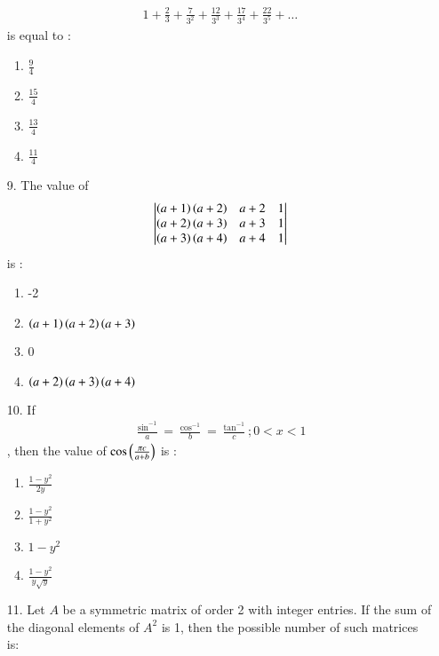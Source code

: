 \documentclass[journal,12pt,onecolumn]{IEEEtran}
\theoremstyle{remark}
\begin{document}
\begin{enumerate}
\begin{align}
		1 + \frac{2}{3} + \frac{7}{3^2} + \frac{12}{3^3} + \frac{17}{3^4} + \frac{22}{3^5} + \dots
	\end{align} is equal to :
		\hfill{}
	\begin{multicols}{4}
		\begin{enumerate}
			\item $\frac{9}{4}$ \columnbreak
			\item $\frac{15}{4}$ \columnbreak
			\item $\frac{13}{4}$ \columnbreak
			\item $\frac{11}{4}$
		\end{enumerate}
	\end{multicols}
\item[9.] The value of
		\begin{align}
			\begin{vmatrix}
			\left(a+1\right)\left(a+2\right) & a+2 & 1 \\
			\left(a+2\right)\left(a+3\right) & a+3 & 1 \\
			\left(a+3\right)\left(a+4\right) & a+4 & 1
			\end{vmatrix}
		\end{align} is :
		\hfill{}
	
		\begin{enumerate}
			\item -2 
			\item $\left(a+1\right)\left(a+2\right)\left(a+3\right)$ 
			\item 0 
			\item $\left(a+2\right)\left(a+3\right)\left(a+4\right)$
		\end{enumerate}
\item[10.] If
		\begin{align}
			\frac{\sin ^{-1}}{a} = \frac{\cos ^{-1}}{b} = \frac{\tan ^{-1}}{c};
			0 < x < 1
		\end{align}, then the value of $\cos \left(\frac{\pi c}{a+b}\right)$ is :
		\hfill{}
		
		\begin{enumerate}
			\item $\frac{1 - y^2}{2y}$ \\
			\item $\frac{1 - y^2}{1 + y^2}$\\
			\item $1 - y^2$ \\
			\item $\frac{1 - y^2}{y\sqrt{y}}$
		\end{enumerate}
\item[11.] Let $A$ be a symmetric matrix of order 2 with integer entries. If the sum of the diagonal
	elements of $A^2$ is 1, then the possible number of such matrices is:
		\hfill{}
		

\end{enumerate}
\end{document}
